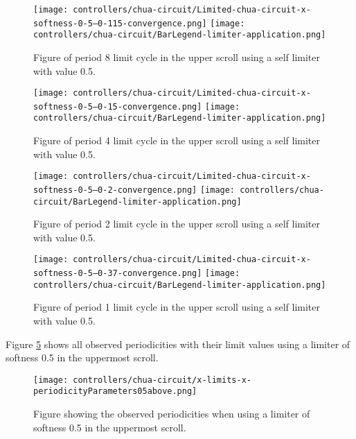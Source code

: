 \documentclass[main]{subfiles}
\begin{document}
\begin{figure}[H]
\centering
\texttt{[image: controllers/chua-circuit/Limited-chua-circuit-x-softness-0-5--0-115-convergence.png]}
\texttt{[image: controllers/chua-circuit/BarLegend-limiter-application.png]}
\caption[Figure of period 8 limit cycle using a 0.5 soft limiter]{Figure of period 8 limit cycle in the upper scroll using a self limiter with value 0.5.}
\label{figure:x-0.5-8-limit-cycle-upperscroll-trajectory}
\end{figure}

\begin{figure}[H]
\centering
\texttt{[image: controllers/chua-circuit/Limited-chua-circuit-x-softness-0-5--0-15-convergence.png]}
\texttt{[image: controllers/chua-circuit/BarLegend-limiter-application.png]}
\caption[Figure of period 4 limit cycle using a 0.5 soft limiter]{Figure of period 4 limit cycle in the upper scroll using a self limiter with value 0.5.}
\label{figure:x-0.5-4-limit-cycle-upperscroll-trajectory}
\end{figure}

\begin{figure}[H]
\centering
\texttt{[image: controllers/chua-circuit/Limited-chua-circuit-x-softness-0-5--0-2-convergence.png]}
\texttt{[image: controllers/chua-circuit/BarLegend-limiter-application.png]}
\caption[Figure of period 2 limit cycle using a 0.5 soft limiter]{Figure of period 2 limit cycle in the upper scroll using a self limiter with value 0.5.}
\label{figure:x-0.5-2-limit-cycle-upperscroll-trajectory}
\end{figure}

\begin{figure}[H]
\centering
\texttt{[image: controllers/chua-circuit/Limited-chua-circuit-x-softness-0-5--0-37-convergence.png]}
\texttt{[image: controllers/chua-circuit/BarLegend-limiter-application.png]}
\caption[Figure of period 1 limit cycle using a 0.5 soft limiter]{Figure of period 1 limit cycle in the upper scroll using a self limiter with value 0.5.}
\label{figure:x-0.5-1-limit-cycle-upperscroll-trajectory}
\end{figure}

Figure \ref{figure:x-limits-x-periodicityParameters05above} shows all observed periodicities with their limit values using a limiter of softness 0.5 in the uppermost scroll. 
\begin{figure}[H]
\centering
\texttt{[image: controllers/chua-circuit/x-limits-x-periodicityParameters05above.png]}
\caption[Figure of observed periodicities in the uppermost scroll with a self-limiting 0.5 limiter]{Figure showing the observed periodicities when using a limiter of softness 0.5 in the uppermost scroll.}
\label{figure:x-limits-x-periodicityParameters05above}
\end{figure}
\end{document}
